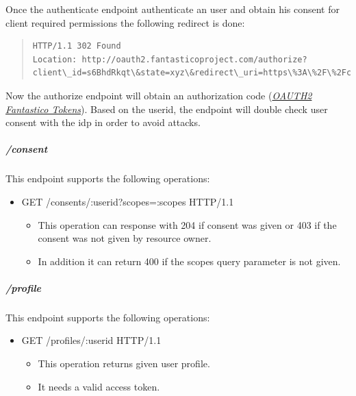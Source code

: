 \documentclass[letterpaper,10pt,english]{sphinxmanual}
\begin{document}
Once the authenticate endpoint authenticate an user and obtain his consent for client required permissions the following redirect
is done:
\begin{quote}

\begin{Verbatim}[commandchars=\\\{\}]
HTTP/1.1 302 Found
Location: http://oauth2.fantasticoproject.com/authorize?client\_id=s6BhdRkqt\&state=xyz\&redirect\_uri=https\%3A\%2F\%2Fclient\%2fantasticoproject\%2Ecom\%2Fcb\%3Fclient\_id\%3Ds6BhdRkqt\%26state\%3D\&scopes=simple\_menus.create\%20simple\_menus.update\%20simple\_menus.delete\&response\_type=code\&userid=123
\end{Verbatim}
\end{quote}

Now the authorize endpoint will obtain an authorization code ({\hyperref[features/oauth2/tokens_format::doc]{\emph{OAUTH2 Fantastico Tokens}}}). Based on the userid,
the endpoint will double check user consent with the idp in order to avoid attacks.


\subparagraph{/consent}
\label{features/oauth2/compatible_idp:consent}
This endpoint supports the following operations:
\begin{itemize}
\item {} 
GET /consents/:userid?scopes=:scopes HTTP/1.1
\begin{itemize}
\item {} 
This operation can response with 204 if consent was given or 403 if the consent was not given by resource owner.

\item {} 
In addition it can return 400 if the scopes query parameter is not given.

\end{itemize}

\end{itemize}


\subparagraph{/profile}
\label{features/oauth2/compatible_idp:profile}
This endpoint supports the following operations:
\begin{itemize}
\item {} 
GET /profiles/:userid HTTP/1.1
\begin{itemize}
\item {} 
This operation returns given user profile.

\item {} 
It needs a valid access token.

\end{itemize}

\end{itemize}
\end{document}
